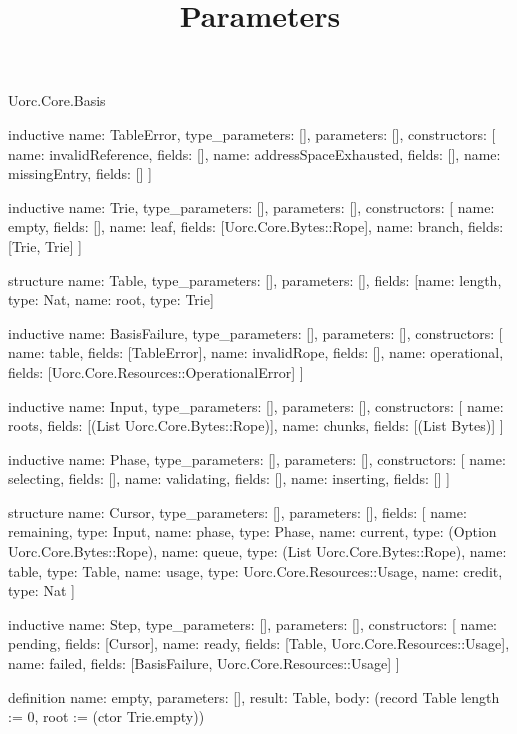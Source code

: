 \begin{lexlean}{Uorc.Core.Basis}
\title{Parameters}
\begin{semanticmodule}
inductive{
  name: TableError,
  type_parameters: [],
  parameters: [],
  constructors: [
    {name: invalidReference, fields: []},
    {name: addressSpaceExhausted, fields: []},
    {name: missingEntry, fields: []}
  ]
}

inductive{
  name: Trie,
  type_parameters: [],
  parameters: [],
  constructors: [
    {name: empty, fields: []},
    {name: leaf, fields: [Uorc.Core.Bytes::Rope]},
    {name: branch, fields: [Trie, Trie]}
  ]
}

structure{
  name: Table,
  type_parameters: [],
  parameters: [],
  fields: [{name: length, type: Nat}, {name: root, type: Trie}]
}

inductive{
  name: BasisFailure,
  type_parameters: [],
  parameters: [],
  constructors: [
    {name: table, fields: [TableError]},
    {name: invalidRope, fields: []},
    {name: operational, fields: [Uorc.Core.Resources::OperationalError]}
  ]
}

inductive{
  name: Input,
  type_parameters: [],
  parameters: [],
  constructors: [
    {name: roots, fields: [(List Uorc.Core.Bytes::Rope)]},
    {name: chunks, fields: [(List Bytes)]}
  ]
}

inductive{
  name: Phase,
  type_parameters: [],
  parameters: [],
  constructors: [
    {name: selecting, fields: []},
    {name: validating, fields: []},
    {name: inserting, fields: []}
  ]
}

structure{
  name: Cursor,
  type_parameters: [],
  parameters: [],
  fields: [
    {name: remaining, type: Input},
    {name: phase, type: Phase},
    {name: current, type: (Option Uorc.Core.Bytes::Rope)},
    {name: queue, type: (List Uorc.Core.Bytes::Rope)},
    {name: table, type: Table},
    {name: usage, type: Uorc.Core.Resources::Usage},
    {name: credit, type: Nat}
  ]
}

inductive{
  name: Step,
  type_parameters: [],
  parameters: [],
  constructors: [
    {name: pending, fields: [Cursor]},
    {name: ready, fields: [Table, Uorc.Core.Resources::Usage]},
    {name: failed, fields: [BasisFailure, Uorc.Core.Resources::Usage]}
  ]
}

definition{
  name: empty,
  parameters: [],
  result: Table,
  body: (record Table {length := 0, root := (ctor Trie.empty)})
}


\end{semanticmodule}
\end{lexlean}
